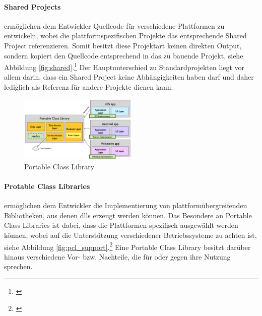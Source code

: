 \paragraph{Shared Projects}

ermöglichen dem Entwickler Quellcode für verschiedene Plattformen zu entwickeln, wobei die plattformspezifischen Projekte das entsprechende Shared Project referenzieren. Somit besitzt diese Projektart keinen direkten Output, sondern kopiert den Quellcode entsprechend in das zu bauende Projekt, siehe Abbildung \eqref{fig:shared}.\footnote{\citep[vgl.][Shared Projects - Xamarin]{Xamarin.SharedProjects}\label{note4x}} Der Hauptunterschied zu Standardprojekten liegt vor allem darin, dass ein Shared Project keine Abhängigkeiten haben darf und daher lediglich als Referenz für andere Projekte dienen kann.

\begin{figure}
	\begin{center}
		\includegraphics[width=0.5\textwidth]{images/technische_grundlagen/PortableClassLibrary.png}
	\end{center}
	\caption{Portable Class Library \cite{Xamarin.PortableClass}}
	\label{fig:portable}
\end{figure}

\paragraph{Protable Class Libraries}

ermöglichen dem Entwickler die Implementierung von plattformübergreifenden Bibliotheken, aus denen \glspl{dll} erzeugt werden können. Das Besondere an Portable Class Libraries ist dabei, dass die Plattformen spezifisch ausgewählt werden können, wobei auf die Unterstützung verschiedener Betriebssysteme zu achten ist, siehe Abbildung \eqref{fig:pcl_support}.\footnote{\citep[vgl.][Introduction to Portable Class Libraries - Xamarin]{Xamarin.PortableClass}\label{note5x}} Eine Portable Class Library besitzt darüber hinaus verschiedene Vor- bzw. Nachteile, die für oder gegen ihre Nutzung sprechen.\\

